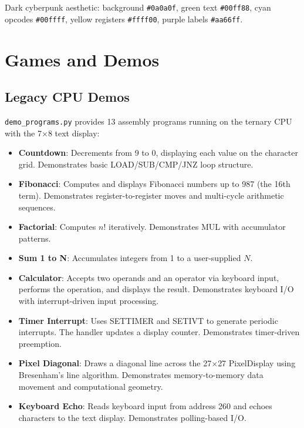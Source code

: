\documentclass[10pt,a4paper,twoside]{book}
\begin{document}
Dark cyberpunk aesthetic: background \texttt{\#0a0a0f}, green text \texttt{\#00ff88},
cyan opcodes \texttt{\#00ffff}, yellow registers \texttt{\#ffff00}, purple labels
\texttt{\#aa66ff}.

\chapter{Games and Demos}
\label{ch:games}

\section{Legacy CPU Demos}

\texttt{demo\_programs.py} provides 13 assembly programs running on the ternary CPU
with the 7$\times$8 text display:

\begin{itemize}
    \item \textbf{Countdown}: Decrements from 9 to 0, displaying each value on the
          character grid. Demonstrates basic LOAD/SUB/CMP/JNZ loop structure.
    \item \textbf{Fibonacci}: Computes and displays Fibonacci numbers up to 987
          (the 16th term). Demonstrates register-to-register moves and multi-cycle
          arithmetic sequences.
    \item \textbf{Factorial}: Computes $n!$ iteratively. Demonstrates MUL with
          accumulator patterns.
    \item \textbf{Sum 1 to N}: Accumulates integers from 1 to a user-supplied $N$.
    \item \textbf{Calculator}: Accepts two operands and an operator via keyboard input,
          performs the operation, and displays the result. Demonstrates keyboard I/O
          with interrupt-driven input processing.
    \item \textbf{Timer Interrupt}: Uses SETTIMER and SETIVT to generate periodic
          interrupts. The handler updates a display counter. Demonstrates timer-driven
          preemption.
    \item \textbf{Pixel Diagonal}: Draws a diagonal line across the 27$\times$27
          PixelDisplay using Bresenham's line algorithm. Demonstrates memory-to-memory
          data movement and computational geometry.
    \item \textbf{Keyboard Echo}: Reads keyboard input from address 260 and echoes
          characters to the text display. Demonstrates polling-based I/O.
\end{itemize}
\end{document}
